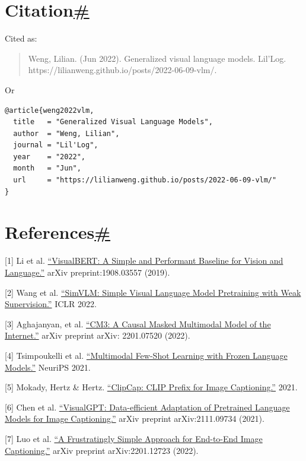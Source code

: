 \section{\texorpdfstring{Citation\hyperref[citation]{\#}}{Citation\#}}\label{citation}

Cited as:

\begin{quote}
Weng, Lilian. (Jun 2022). Generalized visual language models. Lil'Log. https://lilianweng.github.io/posts/2022-06-09-vlm/.
\end{quote}

Or

\begin{verbatim}
@article{weng2022vlm,
  title   = "Generalized Visual Language Models",
  author  = "Weng, Lilian",
  journal = "Lil'Log",
  year    = "2022",
  month   = "Jun",
  url     = "https://lilianweng.github.io/posts/2022-06-09-vlm/"
}
\end{verbatim}

\section{\texorpdfstring{References\hyperref[references]{\#}}{References\#}}\label{references}

{[}1{]} Li et al. \href{https://arxiv.org/abs/1908.03557}{``VisualBERT: A Simple and Performant Baseline for Vision and Language.''} arXiv preprint:1908.03557 (2019).

{[}2{]} Wang et al. \href{https://arxiv.org/abs/2108.10904}{``SimVLM: Simple Visual Language Model Pretraining with Weak Supervision.''} ICLR 2022.

{[}3{]} Aghajanyan, et al. \href{https://arxiv.org/abs/2201.07520}{``CM3: A Causal Masked Multimodal Model of the Internet.''} arXiv preprint arXiv: 2201.07520 (2022).

{[}4{]} Tsimpoukelli et al. \href{https://arxiv.org/abs/2106.13884}{``Multimodal Few-Shot Learning with Frozen Language Models.''} NeuriPS 2021.

{[}5{]} Mokady, Hertz \& Hertz. \href{https://arxiv.org/abs/2111.09734}{``ClipCap: CLIP Prefix for Image Captioning.''} 2021.

{[}6{]} Chen et al. \href{https://arxiv.org/abs/2102.10407}{``VisualGPT: Data-efficient Adaptation of Pretrained Language Models for Image Captioning.''} arXiv preprint arXiv:2111.09734 (2021).

{[}7{]} Luo et al. \href{https://arxiv.org/abs/2201.12723}{``A Frustratingly Simple Approach for End-to-End Image Captioning.''} arXiv preprint arXiv:2201.12723 (2022).


